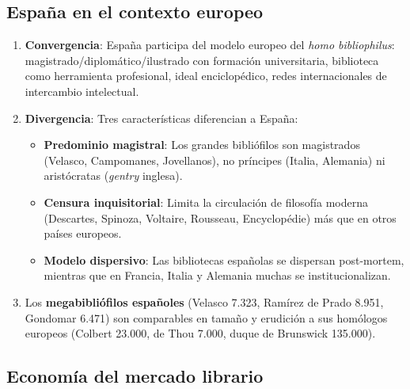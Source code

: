 \documentclass[11pt,a4paper]{article}
\begin{document}
\subsection{España en el contexto europeo}

\begin{enumerate}
\item \textbf{Convergencia}: España participa del modelo europeo del \textit{homo bibliophilus}: magistrado/diplomático/ilustrado con formación universitaria, biblioteca como herramienta profesional, ideal enciclopédico, redes internacionales de intercambio intelectual.

\item \textbf{Divergencia}: Tres características diferencian a España:
\begin{itemize}
\item \textbf{Predominio magistral}: Los grandes bibliófilos son magistrados (Velasco, Campomanes, Jovellanos), no príncipes (Italia, Alemania) ni aristócratas (\textit{gentry} inglesa).
\item \textbf{Censura inquisitorial}: Limita la circulación de filosofía moderna (Descartes, Spinoza, Voltaire, Rousseau, Encyclopédie) más que en otros países europeos.
\item \textbf{Modelo dispersivo}: Las bibliotecas españolas se dispersan post-mortem, mientras que en Francia, Italia y Alemania muchas se institucionalizan.
\end{itemize}

\item Los \textbf{megabibliófilos españoles} (Velasco 7.323, Ramírez de Prado 8.951, Gondomar 6.471) son comparables en tamaño y erudición a sus homólogos europeos (Colbert 23.000, de Thou 7.000, duque de Brunswick 135.000).
\end{enumerate}

\subsection{Economía del mercado librario}
\end{document}
